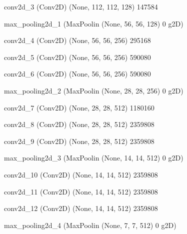 \documentclass[11pt, a4paper]{article} %
\begin{document}
 conv2d_3 (Conv2D)           (None, 112, 112, 128)     147584    
                                                                 
 max_pooling2d_1 (MaxPoolin  (None, 56, 56, 128)       0         
 g2D)                                                            
                                                                 
 conv2d_4 (Conv2D)           (None, 56, 56, 256)       295168    
                                                                 
 conv2d_5 (Conv2D)           (None, 56, 56, 256)       590080    
                                                                 
 conv2d_6 (Conv2D)           (None, 56, 56, 256)       590080    
                                                                 
 max_pooling2d_2 (MaxPoolin  (None, 28, 28, 256)       0         
 g2D)                                                            
                                                                 
 conv2d_7 (Conv2D)           (None, 28, 28, 512)       1180160   
                                                                 
 conv2d_8 (Conv2D)           (None, 28, 28, 512)       2359808   
                                                                 
 conv2d_9 (Conv2D)           (None, 28, 28, 512)       2359808   
                                                                 
 max_pooling2d_3 (MaxPoolin  (None, 14, 14, 512)       0         
 g2D)                                                            
                                                                 
 conv2d_10 (Conv2D)          (None, 14, 14, 512)       2359808   
                                                                 
 conv2d_11 (Conv2D)          (None, 14, 14, 512)       2359808   
                                                                 
 conv2d_12 (Conv2D)          (None, 14, 14, 512)       2359808   
                                                                 
 max_pooling2d_4 (MaxPoolin  (None, 7, 7, 512)         0         
 g2D)                                                            
                                                                 
\end{document}

